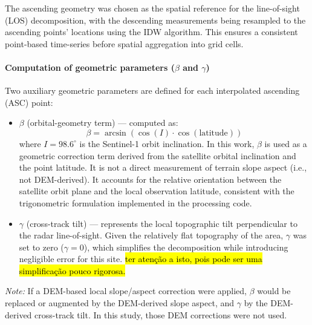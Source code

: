 \documentclass[11pt,a4paper]{article}
\begin{document}
The ascending geometry was chosen as the spatial reference for the line-of-sight (LOS) decomposition, with the descending measurements being resampled to the ascending points' locations using the IDW algorithm. This ensures a consistent point-based time-series before spatial aggregation into grid cells.


\paragraph{Computation of geometric parameters ($\beta$ and $\gamma$)}

Two auxiliary geometric parameters are defined for each interpolated ascending (ASC) point:

\begin{itemize}
  \item $\beta$ (orbital-geometry term) — computed as:
  \begin{equation}
    \beta = \arcsin\left( \cos(I) \cdot \cos(\text{latitude}) \right)
  \end{equation}
  where $I = 98.6^{\circ}$ is the Sentinel-1 orbit inclination.  
  In this work, $\beta$ is used as a geometric correction term derived from the satellite orbital inclination and the point latitude.  
  It is not a direct measurement of terrain slope aspect (i.e., not DEM-derived).  
  It accounts for the relative orientation between the satellite orbit plane and the local observation latitude, consistent with the trigonometric formulation implemented in the processing code.

  \item $\gamma$ (cross-track tilt) — represents the local topographic tilt perpendicular to the radar line-of-sight.  
  Given the relatively flat topography of the area, $\gamma$ was set to zero ($\gamma = 0$), which simplifies the decomposition while introducing negligible error for this site. \hl{\mbox ter atenção a isto, pois pode ser uma simplificação pouco rigorosa.} 
\end{itemize}

\noindent
\textit{Note:} If a DEM-based local slope/aspect correction were applied, $\beta$ would be replaced or augmented by the DEM-derived slope aspect, and $\gamma$ by the DEM-derived cross-track tilt.  
In this study, those DEM corrections were not used.
\end{document}

